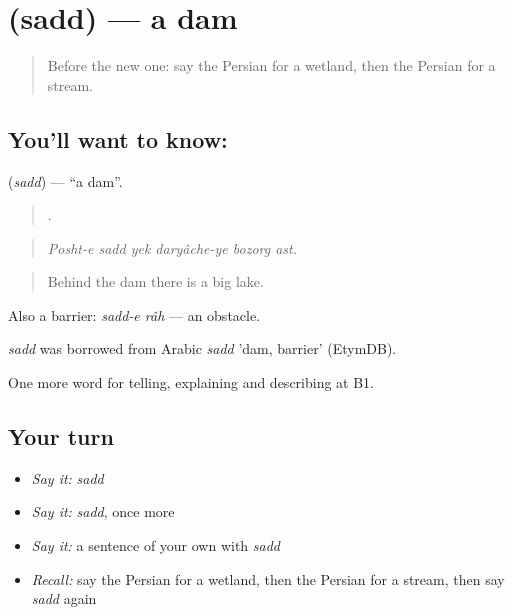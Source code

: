 \section[\texorpdfstring{\fa{سد} (sadd)}{سد (sadd)}]{ (sadd) — a dam}

\label{lesson:FA-C469-sadd}



\begin{quote}
Before the new one: say the Persian for a wetland, then the Persian for a stream.
\end{quote}

\subsection*{You'll want to know: }
\textbf{} (\emph{sadd}) — \textquotedblleft{}a dam\textquotedblright{}.

\begin{quote}
     .
\end{quote}

\begin{quote}
\emph{Posht-e sadd yek daryâche-ye bozorg ast.}
\end{quote}

\begin{quote}
Behind the dam there is a big lake.
\end{quote}

Also a barrier: \emph{sadd-e râh} — an obstacle.

\begin{cousinweb}
\emph{sadd} was borrowed from Arabic \emph{sadd} 'dam, barrier' (EtymDB).
\end{cousinweb}

\begin{grammarlens}[title={What you've built}]
One more word for telling, explaining and describing at B1.
\end{grammarlens}

\subsection*{Your turn}
\begin{itemize}
\raggedright
  \item \emph{Say it:} \emph{sadd}
  \item \emph{Say it:} \emph{sadd}, once more
  \item \emph{Say it:} a sentence of your own with \emph{sadd}
  \item \emph{Recall:} say the Persian for a wetland, then the Persian for a stream, then say \emph{sadd} again
\end{itemize}

